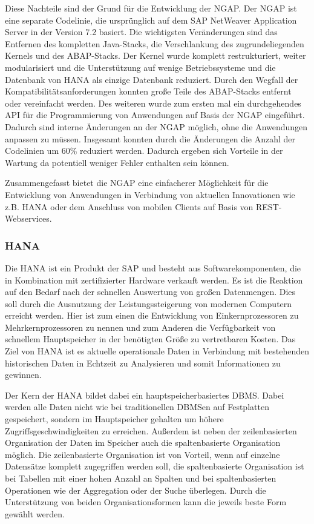 Diese Nachteile sind der Grund für die Entwicklung der \gls{NGAP}. Der \gls{NGAP} ist eine separate Codelinie, die ursprünglich auf dem SAP NetWeaver Application Server in der Version 7.2 basiert. Die wichtigsten Veränderungen sind das Entfernen des kompletten Java-Stacks, die Verschlankung des zugrundeliegenden Kernels und des ABAP-Stacks. Der Kernel wurde komplett restrukturiert, weiter modularisiert und die Unterstützung auf wenige Betriebssysteme und die Datenbank von \gls{HANA} als einzige Datenbank reduziert. Durch den Wegfall der Kompatibilitätsanforderungen konnten große Teile des ABAP-Stacks entfernt oder vereinfacht werden. Des weiteren wurde zum ersten mal ein durchgehendes API für die Programmierung von Anwendungen auf Basis der \gls{NGAP} eingeführt. Dadurch sind interne Änderungen an der \gls{NGAP} möglich, ohne die Anwendungen anpassen zu müssen. Insgesamt konnten durch die Änderungen die Anzahl der Codelinien um 60\% reduziert werden. Dadurch ergeben sich Vorteile in der Wartung da potentiell weniger Fehler enthalten sein können.

Zusammengefasst bietet die \gls{NGAP} eine einfacherer Möglichkeit für die Entwicklung von Anwendungen in Verbindung von aktuellen Innovationen wie z.B. \gls{HANA} oder dem Anschluss von mobilen Clients auf Basis von REST-Webservices.

\subsubsection{HANA}
Die \gls{HANA} ist ein Produkt der SAP und besteht aus Softwarekomponenten, die in Kombination mit zertifizierter Hardware verkauft werden. Es ist die Reaktion auf den Bedarf nach der schnellen Auswertung von großen Datenmengen. Dies soll durch die Ausnutzung der Leistungssteigerung von modernen Computern erreicht werden. Hier ist zum einen die Entwicklung von Einkernprozessoren zu Mehrkernprozessoren zu nennen und zum Anderen die Verfügbarkeit von schnellem Hauptspeicher in der benötigten Größe zu vertretbaren Kosten. Das Ziel von \gls{HANA} ist es aktuelle operationale Daten in Verbindung mit bestehenden historischen Daten in Echtzeit zu Analysieren und somit Informationen zu gewinnen.

Der Kern der \gls{HANA} bildet dabei ein hauptspeicherbasiertes \gls{DBMS}. Dabei werden alle Daten nicht wie bei traditionellen \gls{DBMS}en auf Festplatten gespeichert, sondern im Hauptspeicher gehalten um höhere Zugriffsgeschwindigkeiten zu erreichen. Außerdem ist neben der zeilenbasierten Organisation der Daten im Speicher auch die spaltenbasierte Organisation möglich. Die zeilenbasierte Organisation ist von Vorteil, wenn auf einzelne Datensätze komplett zugegriffen werden soll, die spaltenbasierte Organisation ist bei Tabellen mit einer hohen Anzahl an Spalten und bei spaltenbasierten Operationen wie der Aggregation oder der Suche überlegen. Durch die Unterstützung von beiden Organisationsformen kann die jeweils beste Form gewählt werden.

